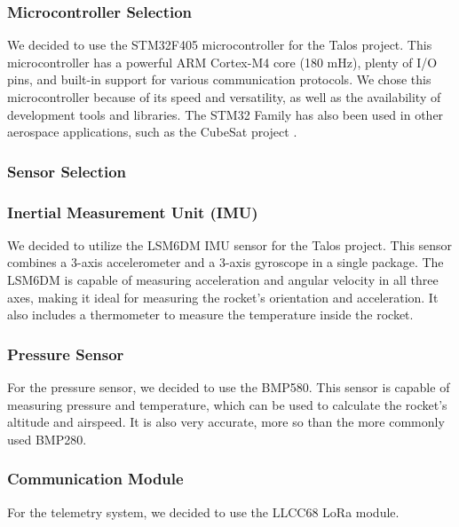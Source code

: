 \documentclass{article}
\begin{document}
\subsubsection{Microcontroller Selection}
We decided to use the STM32F405 microcontroller for the Talos project. This microcontroller has a powerful ARM Cortex-M4 core (180 mHz), plenty of I/O pins, and built-in support for various communication protocols. We chose this microcontroller because of its speed and versatility, as well as the availability of development tools and libraries. The STM32 Family has also been used in other aerospace applications, such as the CubeSat project \cite{Yost_2023}.
\subsubsection{Sensor Selection}
\subsubsection*{Inertial Measurement Unit (IMU)}
We decided to utilize the LSM6DM IMU sensor for the Talos project. This sensor combines a 3-axis accelerometer and a 3-axis gyroscope in a single package. The LSM6DM is capable of measuring acceleration and angular velocity in all three axes, making it ideal for measuring the rocket's orientation and acceleration. It also includes a thermometer to measure the temperature inside the rocket.
\subsubsection*{Pressure Sensor}
For the pressure sensor, we decided to use the BMP580. This sensor is capable of measuring pressure and temperature, which can be used to calculate the rocket's altitude and airspeed. It is also very accurate, more so than the more commonly used BMP280. \cite{Bosch_Sensortec_2024}
\subsubsection{Communication Module}
For the telemetry system, we decided to use the LLCC68 LoRa module.



\printbibliography
\end{document}
